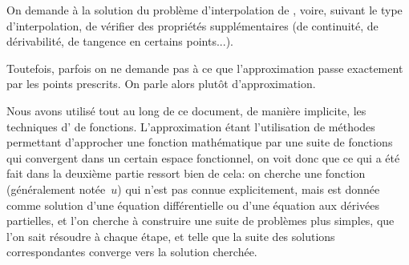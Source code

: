 \begin{histoire}
\medskip
{}
\end{histoire}


On demande à la solution du problème d'interpolation de , 
voire, suivant le type d'interpolation, de vérifier des propriétés supplémentaires (de continuité,
de dérivabilité, de tangence en certains points...).

Toutefois, parfois on ne demande pas à ce que l'approximation passe exactement
par les points prescrits. On parle alors plutôt d'approximation.

\medskip
Nous avons utilisé tout au long de ce document, de manière implicite, les techniques 
d' de fonctions.
L'approximation étant l'utilisation de méthodes permettant d'approcher une fonction mathématique 
par une suite de fonctions qui convergent dans un certain espace fonctionnel, on voit donc que ce qui 
a été fait dans la deuxième partie ressort bien de cela:
on cherche une fonction (généralement notée~$u$) qui n'est pas connue explicitement, mais est donnée 
comme solution d'une équation différentielle ou d'une équation aux dérivées partielles, et l'on cherche à construire une suite de problèmes plus simples, 
que l'on sait résoudre à chaque étape, et telle que la suite des solutions correspondantes converge 
vers la solution cherchée.

